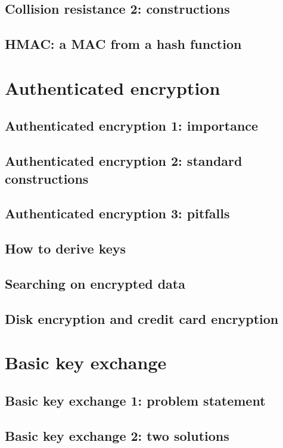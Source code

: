 \documentclass[10pt,a4paper]{report}
\begin{document}
\section{Collision resistance 2: constructions}
\section{HMAC: a MAC from a hash function}

\chapter{Authenticated encryption}

\section{Authenticated encryption 1: importance}
\section{Authenticated encryption 2: standard constructions}
\section{Authenticated encryption 3: pitfalls}
\section{How to derive keys}
\section{Searching on encrypted data}
\section{Disk encryption and credit card encryption}

\chapter{Basic key exchange}

\section{Basic key exchange 1: problem statement}
\section{Basic key exchange 2: two solutions}
\end{document}
